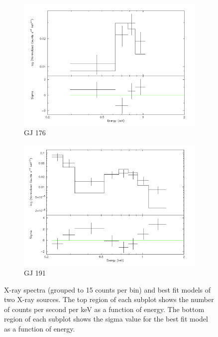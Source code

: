 \begin{appendices}
\begin{figure}
\begin{subfigure}{\textwidth}
	\centering
	\includegraphics[height = 0.25\paperheight,width=\textwidth]{Figures/3-Xray_age/spec_gj176}
	\caption{GJ 176}
\end{subfigure}
\begin{subfigure}{\textwidth}
	\centering
	\includegraphics[height = 0.25\paperheight,width=\textwidth]{Figures/3-Xray_age/spec_gj191}
	\caption{GJ 191}
\end{subfigure}

\caption[X-ray spectra of GJ 176 and GJ 191]{X-ray spectra (grouped to 15 counts per bin) and best fit models of two X-ray sources. The top region of each subplot shows the number of counts per second per keV as a function of energy. The bottom region of each subplot shows the sigma value for the best fit model as a function of energy.}
\label{App_A_GJ176_GJ191}
\end{figure}



\end{appendices}
